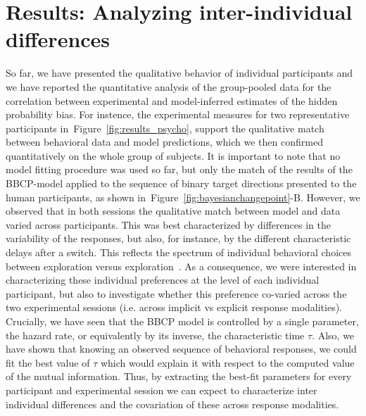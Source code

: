 \documentclass[12pt,english]{article}%
\newcommand{\citep}[1]{\parencite{#1}}
\newcommand{\seeFig}[1]{Figure~\ref{fig:#1}}
\begin{document}
\section{Results: Analyzing inter-individual differences}
\label{sec:inter}
So far, we have presented the qualitative behavior of individual participants and 
we have reported the quantitative analysis of the group-pooled data 
for the correlation between experimental and model-inferred estimates of the hidden probability bias.
For instence, the experimental measures for two representative participants in~\seeFig{results_psycho},
support the qualitative match between behavioral data and model predictions,
which we then confirmed quantitatively on the whole group of subjects.
It is important to note that no model fitting procedure was used so far,
but only the match of the results of the BBCP-model 
applied to the sequence of binary target directions 
presented to the human participants, 
as shown in~\seeFig{bayesianchangepoint}-B.
However, we observed that in both sessions the qualitative match between model and data varied across participants.
This was best characterized by differences
in the variability of the responses, but also, for instance,
by the different characteristic delays after a switch.
This reflects the spectrum of individual behavioral choices
between exploration versus exploration~\citep{Behrens07}.
As a consequence, we were interested in characterizing these individual preferences
at the level of each individual participant, but also to investigate
whether this preference co-varied across the two experimental sessions (i.e. across implicit vs explicit response modalities).
Crucially, we have seen that the BBCP model is controlled by a single parameter,
the hazard rate, or equivalently by its inverse, the characteristic time $\tau$.
Also, we have shown that knowing an observed sequence of behavioral responses,
we could fit the best value of $\tau$ which would explain it
with respect to the computed value of the mutual information.
Thus, by extracting the best-fit parameters for every participant and experimental session
we can expect to characterize inter individual differences and the covariation of these across response modalities.
\end{document}
